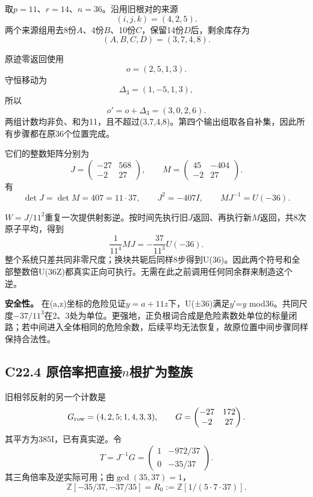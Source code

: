 \documentclass[11pt,a4paper]{article}
\theoremstyle{definition}
\numberwithin{equation}{section}
\begin{document}
{取\ensuremath{p=11}、\ensuremath{r=14}、\ensuremath{n=36}。沿用旧根对的来源} \[
(i,j,k)=(4,2,5).
\] {两个来源组用去8份\ensuremath{A}、4份\ensuremath{B}、10份\ensuremath{C}，保留14份\ensuremath{D}后，剩余库存为} \[
(A,B,C,D)=(3,7,4,8).
\]

{原迹零返回使用} \[
o=(2,5,1,3).
\] {守恒移动为} \[
\Delta_3=(1,-5,1,3),
\] {所以} \[
\boxed{o'=o+\Delta_3=(3,0,2,6).}
\] {两组计数均非负、和为11，且不超过(3,7,4,8)。第四个输出组取各自补集，因此所有步骤都在原36个位置完成。}

{它们的整数矩阵分别为} \[
J=\begin{pmatrix}-27&568\\-2&27\end{pmatrix},
\qquad
M=\begin{pmatrix}45&-404\\-2&27\end{pmatrix}.
\] {有} \[
\det J=\det M=407=11\cdot37,\qquad
J^2=-407I,\qquad
\boxed{MJ^{-1}=U(-36).}
\tag{C22.3.1}
\]

{\ensuremath{W=J/11^{2}}重复一次提供射影逆。按时间先执行旧\ensuremath{J}返回、再执行新\ensuremath{M}返回，共8次原子平均，得到} \[
\frac1{11^4}MJ
=-\frac{37}{11^3}U(-36).
\] {整个系统只差共同非零尺度；换块共轭后同样8步得到U(36)。因此两个符号和全部整数倍U(36Z)都真实正向可执行。无需在此之前调用任何同余群来制造这个逆。}

\textbf{{安全性。}} {在(a,z)坐标的危险见证\ensuremath{y=a+11z}下，U(±36)满足\ensuremath{y}′=\ensuremath{y}} {mod36。共同尺度−\ensuremath{37/11^{3}}在2、3处为单位。更强地，正负根词合成是危险素数处单位的标量闭路；若中间进入全体相同的危险余数，后续平均无法恢复，故原位置中间步骤同样保持合法性。}

\subsection*{\texorpdfstring{{C22.4} {原倍率把直接\ensuremath{n}根扩为整族}}{C22.4 原倍率把直接根扩为整族}}\label{C22-h149}

{旧相邻反射的另一个计数是} \[
G_{\rm row}=(4,2,5;1,4,3,3),\qquad
G=\begin{pmatrix}-27&172\\-2&27\end{pmatrix}.
\] {其平方为385I，已有真实逆。令} \[
T=J^{-1}G=
\begin{pmatrix}1&-972/37\\0&-35/37\end{pmatrix}.
\] {其三角倍率及逆实际可用；由\ensuremath{\operatorname{gcd}(35,37)=1}，} \[
\mathbb Z[-35/37,-37/35]=
R_0:=\mathbb Z[1/(5\cdot7\cdot37)].
\]
\end{document}

